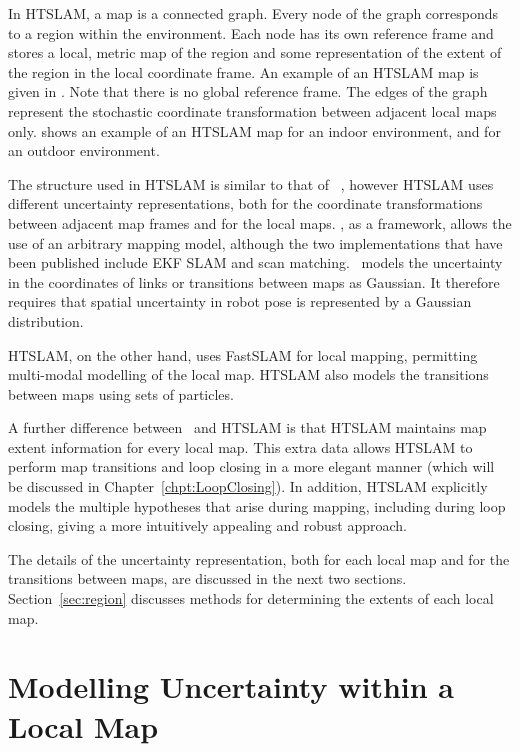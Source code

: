 In HTSLAM, a map is a connected graph. Every node of the graph
corresponds to a region within the environment. Each node has its own
reference frame and stores a local, metric map of the region and some
representation of the extent of the region in the local coordinate
frame. An example of an HTSLAM map is given in 
. Note that there is no global reference
frame. The edges of the graph represent the stochastic coordinate
transformation between adjacent local maps
only.  shows an example of an
HTSLAM map for an indoor environment, and
 for an outdoor environment.

The structure used in HTSLAM is similar to that of \Atlas\
\cite{bosse03atlas}, however HTSLAM uses different uncertainty
representations, both for the coordinate transformations between
adjacent map frames and for the local maps.  \Atlas, as a framework,
allows the use of an arbitrary mapping model, although the two
implementations that have been published include EKF SLAM and scan
matching. \Atlas\ models the uncertainty in the coordinates of links
or transitions between maps as Gaussian.  It therefore requires that
spatial uncertainty in robot pose is represented by a Gaussian
distribution.

HTSLAM, on the other hand, uses FastSLAM for local mapping, permitting
multi-modal modelling of the local map. HTSLAM also models the
transitions between maps using sets of particles.

A further difference between \Atlas\ and HTSLAM is that HTSLAM
maintains map extent information for every local map. This extra data
allows HTSLAM to perform map transitions and loop closing in a more
elegant manner (which will be discussed in
Chapter~\ref{chpt:LoopClosing}). In addition, HTSLAM explicitly
models the multiple hypotheses that arise during mapping, including
during loop closing, giving a more intuitively appealing and robust
approach.

The details of the uncertainty representation, both for each local map
and for the transitions between maps, are discussed in the next two
sections.  Section~\ref{sec:region} discusses methods for
determining the extents of each local map.

\section{Modelling Uncertainty within a Local Map}
\label{sec:local_map}

